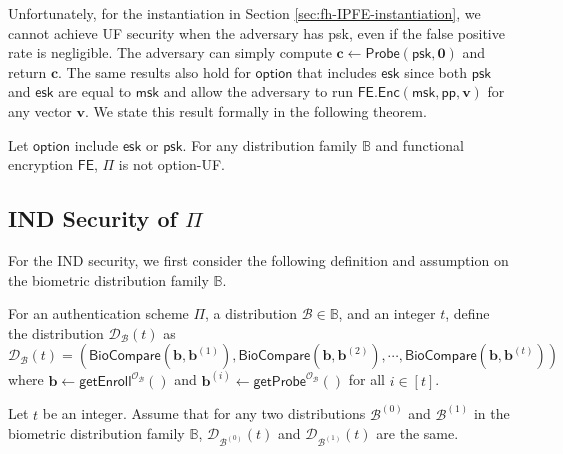 Unfortunately, for the instantiation in Section \ref{sec:fh-IPFE-instantiation}, we cannot achieve UF security when the adversary has \textsf{psk}, even if the false positive rate is negligible. The adversary can simply compute $\mathbf{c} \gets \textsf{Probe}(\textsf{psk}, \mathbf{0})$ and return $\mathbf{c}$. The same results also hold for $\textsf{option}$ that includes $\textsf{esk}$ since both $\textsf{psk}$ and $\textsf{esk}$ are equal to $\textsf{msk}$ and allow the adversary to run $\textsf{FE.Enc}(\textsf{msk}, \textsf{pp}, \mathbf{v})$ for any vector $\mathbf{v}$. We state this result formally in the following theorem.

\begin{theorem}

Let $\textsf{option}$ include $\textsf{esk}$ or $\textsf{psk}$. For any distribution family $\mathbb{B}$ and functional encryption $\textsf{FE}$, $\Pi$ is not \textsf{option}-UF.

\end{theorem}




\subsection{IND Security of $\Pi$}
\label{sec:security_analysis:fh-IPFE:IND}

For the IND security, we first consider the following definition and assumption on the biometric distribution family $\mathbb{B}$.

\begin{definition}
For an authentication scheme $\Pi$, a distribution $\mathcal{B} \in \mathbb{B}$, and an integer $t$, define the distribution $\mathcal{D}_\mathcal{B}(t)$ as
\[
	\mathcal{D}_\mathcal{B}(t) = \left( \textsf{BioCompare}(\mathbf{b}, \mathbf{b}^{(1)}), \textsf{BioCompare}(\mathbf{b}, \mathbf{b}^{(2)}), \cdots, \textsf{BioCompare}(\mathbf{b}, \mathbf{b}^{(t)}) \right)
\]
where $\mathbf{b} \gets \textsf{getEnroll}^{\mathcal{O}_\mathcal{B}}()$ and $ \mathbf{b}^{(i)} \gets \textsf{getProbe}^{\mathcal{O}_\mathcal{B}}()$ for all $i \in [t]$.

\end{definition}

\begin{assumption}
\label{assump:equal_distance}
Let $t$ be an integer. Assume that for any two distributions $\mathcal{B}^{(0)}$ and $\mathcal{B}^{(1)}$ in the biometric distribution family $\mathbb{B}$, $\mathcal{D}_{ \mathcal{B}^{(0)} }(t)$ and $\mathcal{D}_{ \mathcal{B}^{(1)} }(t)$ are the same. 

\end{assumption}

